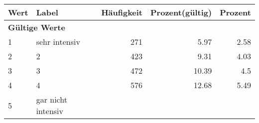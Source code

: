      \begin{longtable}{lXrrr}
     \toprule
     \textbf{Wert} & \textbf{Label} & \textbf{Häufigkeit} & \textbf{Prozent(gültig)} & \textbf{Prozent} \\
     \endhead
     \midrule
     \multicolumn{5}{l}{\textbf{Gültige Werte}}\\

     1 &
     \multicolumn{1}{X}{ sehr intensiv   } &


       \num{271} &
       \num[round-mode=places,round-precision=2]{5,97} &
         \num[round-mode=places,round-precision=2]{2,58} \\

     2 &
     \multicolumn{1}{X}{ 2   } &


       \num{423} &
       \num[round-mode=places,round-precision=2]{9,31} &
         \num[round-mode=places,round-precision=2]{4,03} \\

     3 &
     \multicolumn{1}{X}{ 3   } &


       \num{472} &
       \num[round-mode=places,round-precision=2]{10,39} &
         \num[round-mode=places,round-precision=2]{4,5} \\

     4 &
     \multicolumn{1}{X}{ 4   } &


       \num{576} &
       \num[round-mode=places,round-precision=2]{12,68} &
         \num[round-mode=places,round-precision=2]{5,49} \\

     5 &
     \multicolumn{1}{X}{ gar nicht intensiv   } &



\end{longtable}
